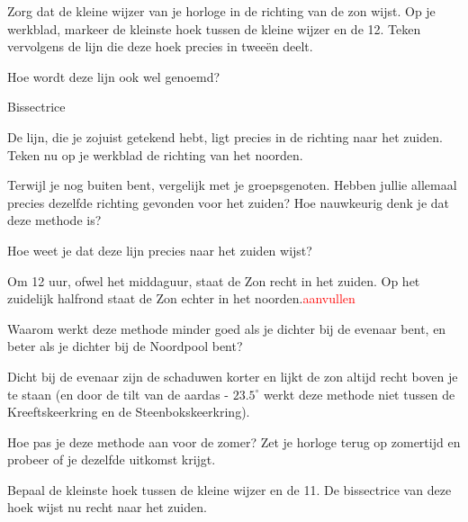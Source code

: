 \begin{opgave}[\schaar]
    Zorg dat de kleine wijzer van je horloge in de richting van de zon wijst. Op je werkblad, markeer de kleinste hoek tussen de kleine wijzer en de 12. Teken vervolgens de lijn die deze hoek precies in twee\"{e}n deelt.
\end{opgave}

\begin{opgave}
    Hoe wordt deze lijn ook wel genoemd? 
    \begin{antwoord}
         Bissectrice
    \end{antwoord}
\end{opgave}

De lijn, die je zojuist getekend hebt, ligt precies in de richting naar het zuiden. Teken nu op je werkblad de richting van het noorden.

\begin{opgave}[\discussie]
    Terwijl je nog buiten bent, vergelijk met je groepsgenoten. Hebben jullie allemaal precies dezelfde richting gevonden voor het zuiden? Hoe nauwkeurig denk je dat deze methode is?
\end{opgave}

\begin{opgave}
    Hoe weet je dat deze lijn precies naar het zuiden wijst?
    \begin{antwoord}
        Om 12 uur, ofwel het middaguur, staat de Zon recht in het zuiden. Op het zuidelijk halfrond staat de Zon echter in het noorden.\textcolor{red}{aanvullen}
    \end{antwoord}
\end{opgave}

\begin{opgave}
    Waarom werkt deze methode minder goed als je dichter bij de evenaar bent, en beter als je dichter bij de Noordpool bent? 
    \begin{antwoord}
        Dicht bij de evenaar zijn de schaduwen korter en lijkt de zon altijd recht boven je te staan (en door de tilt van de aardas - $23.5^{\circ}$ werkt deze methode niet tussen de Kreeftskeerkring en de Steenbokskeerkring).
    \end{antwoord}
\end{opgave}

\begin{opgave}[\schaar]
    Hoe pas je deze methode aan voor de zomer? Zet je horloge terug op zomertijd en probeer of je dezelfde uitkomst krijgt.
    \begin{antwoord}
        Bepaal de kleinste hoek tussen de kleine wijzer en de 11. De bissectrice van deze hoek wijst nu recht naar het zuiden.   
    \end{antwoord}
\end{opgave}

